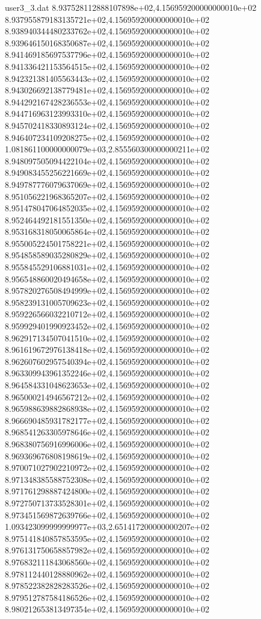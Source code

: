 \begin{filecontents}{user3_3.dat}
8.937528112888107898e+02,4.156959200000000010e+02
8.937955879183135721e+02,4.156959200000000010e+02
8.938940344480233762e+02,4.156959200000000010e+02
8.939646150168350687e+02,4.156959200000000010e+02
8.941469185697537796e+02,4.156959200000000010e+02
8.941336421153564515e+02,4.156959200000000010e+02
8.942321381405563443e+02,4.156959200000000010e+02
8.943026692138779481e+02,4.156959200000000010e+02
8.944292167428236553e+02,4.156959200000000010e+02
8.944716963123993310e+02,4.156959200000000010e+02
8.945702418330893124e+02,4.156959200000000010e+02
8.946407234109208275e+02,4.156959200000000010e+02
1.081861100000000079e+03,2.855560300000000211e+02
8.948097505094422104e+02,4.156959200000000010e+02
8.949083455256221669e+02,4.156959200000000010e+02
8.949787776079637069e+02,4.156959200000000010e+02
8.951056221968365207e+02,4.156959200000000010e+02
8.951478047064852035e+02,4.156959200000000010e+02
8.952464492181551350e+02,4.156959200000000010e+02
8.953168318050065864e+02,4.156959200000000010e+02
8.955005224501758221e+02,4.156959200000000010e+02
8.954858589035280829e+02,4.156959200000000010e+02
8.955845529106881031e+02,4.156959200000000010e+02
8.956548860020494658e+02,4.156959200000000010e+02
8.957820276508494999e+02,4.156959200000000010e+02
8.958239131005709623e+02,4.156959200000000010e+02
8.959226566032210712e+02,4.156959200000000010e+02
8.959929401990923452e+02,4.156959200000000010e+02
8.962917134507041510e+02,4.156959200000000010e+02
8.961619672976138418e+02,4.156959200000000010e+02
8.962607602957540394e+02,4.156959200000000010e+02
8.963309943961352246e+02,4.156959200000000010e+02
8.964584331048623653e+02,4.156959200000000010e+02
8.965000214946567212e+02,4.156959200000000010e+02
8.965988639882868938e+02,4.156959200000000010e+02
8.966690485931782177e+02,4.156959200000000010e+02
8.968541263305978646e+02,4.156959200000000010e+02
8.968380756916996006e+02,4.156959200000000010e+02
8.969369676808198619e+02,4.156959200000000010e+02
8.970071027902210972e+02,4.156959200000000010e+02
8.971348385588752308e+02,4.156959200000000010e+02
8.971761298887424800e+02,4.156959200000000010e+02
8.972750713733528301e+02,4.156959200000000010e+02
8.973451569872639766e+02,4.156959200000000010e+02
1.093423099999999977e+03,2.651417200000000207e+02
8.975141840857853595e+02,4.156959200000000010e+02
8.976131750658857982e+02,4.156959200000000010e+02
8.976832111843068560e+02,4.156959200000000010e+02
8.978112440128880962e+02,4.156959200000000010e+02
8.978522382828283526e+02,4.156959200000000010e+02
8.979512787584186526e+02,4.156959200000000010e+02
8.980212653813497354e+02,4.156959200000000010e+02

\end{filecontents}
